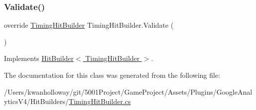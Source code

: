 \subsubsection{\texorpdfstring{Validate()}{Validate()}}
{\footnotesize\ttfamily override \hyperlink{class_timing_hit_builder}{Timing\+Hit\+Builder} Timing\+Hit\+Builder.\+Validate (\begin{DoxyParamCaption}{ }\end{DoxyParamCaption})\hspace{0.3cm}{\ttfamily [virtual]}}



Implements \hyperlink{class_hit_builder_a0f4833828bd530bb057c9ca359584bce}{Hit\+Builder$<$ Timing\+Hit\+Builder $>$}.



The documentation for this class was generated from the following file\+:\begin{DoxyCompactItemize}
\item 
/\+Users/kwanholloway/git/5001\+Project/\+Game\+Project/\+Assets/\+Plugins/\+Google\+Analytics\+V4/\+Hit\+Builders/\hyperlink{_timing_hit_builder_8cs}{Timing\+Hit\+Builder.\+cs}\end{DoxyCompactItemize}
